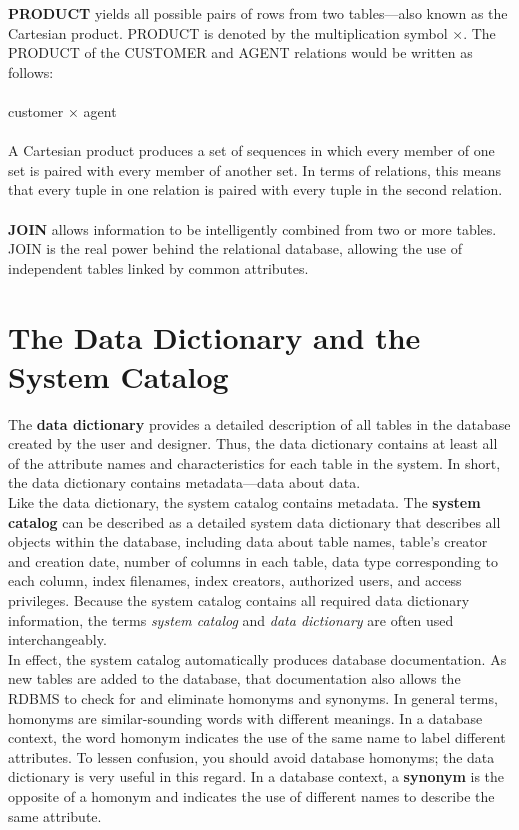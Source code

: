 \documentclass[a4paper, 12pt, titlepage]{report}
\begin{document}
{\textbf{PRODUCT} yields all possible pairs of rows from two tables—also known as the Cartesian product. PRODUCT is denoted by the multiplication symbol ×. The PRODUCT of the CUSTOMER and AGENT relations would be written as follows:\\ \\
customer × agent\\ \\
A Cartesian product produces a set of sequences in which every member of one set is paired with every member of another set. In terms of relations, this means that every tuple in one relation is paired with every tuple in the second relation.\\ \\
\textbf{JOIN} allows information to be intelligently combined from two or more tables. JOIN is the real power behind the relational database, allowing the use of independent tables linked by common attributes. 
\section{The Data Dictionary and the System Catalog}
The \textbf{data dictionary} provides a detailed description of all tables in the database created by the user and designer. Thus, the data dictionary contains at least all of the attribute names and characteristics for each table in the system. In short, the data dictionary contains metadata—data about data.\\
Like the data dictionary, the system catalog contains metadata. The \textbf{system catalog} can be described as a detailed system data dictionary that describes all objects within the database, including data about table names, table’s creator and creation
date, number of columns in each table, data type corresponding to each column, index filenames, index creators, authorized users, and access privileges. Because the system catalog contains all required data dictionary information, the terms \emph{system catalog} and \emph{data dictionary} are often used interchangeably.\\
In effect, the system catalog automatically produces database documentation. As new tables are added to the database, that documentation also allows the RDBMS to check for and eliminate homonyms and synonyms. In general terms, homonyms are similar-sounding words with different meanings. In a database context, the word homonym indicates the use of the same name to label different attributes. To lessen confusion, you should avoid database homonyms; the data dictionary is very useful in this regard. In a database context, a \textbf{synonym} is the opposite of a homonym and indicates the use of different names to describe the same attribute. 
}
\end{document}
